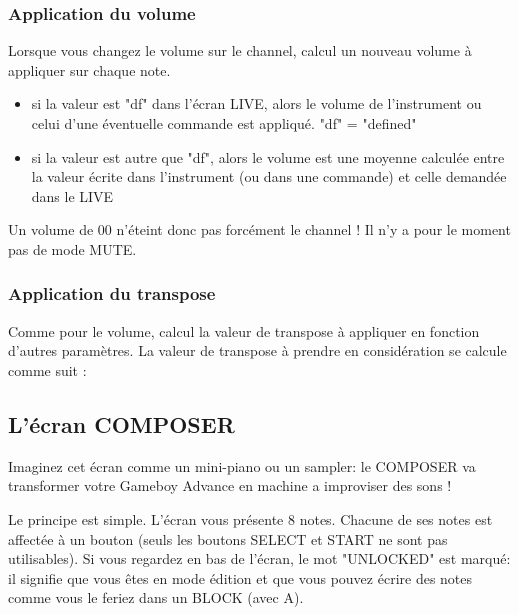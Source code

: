 \documentclass[12pt,a4paper]{article}
\begin{document}
    \subsubsection{Application du volume}

    Lorsque vous changez le volume sur le channel, \FAT calcul un nouveau volume à appliquer sur chaque note. \medskip

    \begin{itemize}
        \item{si la valeur est "df" dans l'écran LIVE, alors le volume de l'instrument ou celui d'une éventuelle commande est appliqué. "df" = "defined"}
        \item{si la valeur est autre que "df", alors le volume est une moyenne calculée entre la valeur écrite dans l'instrument (ou dans une commande) et celle demandée dans le LIVE}
    \end{itemize}
    \medskip

    Un volume de 00 n'éteint donc pas forcément le channel ! Il n'y a pour le moment pas de mode MUTE.

    \subsubsection{Application du transpose}

    Comme pour le volume, \FAT calcul la valeur de transpose à appliquer en fonction d'autres paramètres. La valeur de transpose à prendre en considération se calcule comme suit :


    \subsection{L'écran COMPOSER}

    Imaginez cet écran comme un mini-piano ou un sampler: le COMPOSER va transformer votre Gameboy Advance en machine a improviser des sons !


    Le principe est simple. L'écran vous présente 8 notes. Chacune de ses notes est affectée à un bouton (seuls les boutons SELECT et START ne sont pas utilisables). Si vous regardez en bas de l'écran, le mot "UNLOCKED" est marqué: il signifie que vous êtes en mode édition et que vous pouvez écrire des notes comme vous le feriez dans un BLOCK (avec A). \medskip
\end{document}
